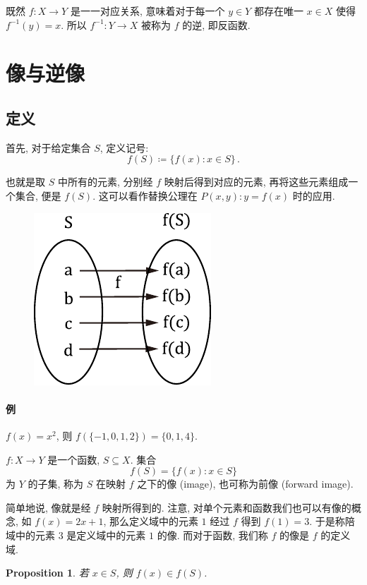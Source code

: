 \documentclass[UTF8]{ctexart}
\theoremstyle{mystyle}
\newtheorem{proposition}{Proposition}[section]
\theoremstyle{myremark}
\theoremstyle{plain}
\newcommand{\set}[1]{\{#1\}}
\begin{document}
既然 $ f \colon X \to Y $ 是一一对应关系, 意味着对于每一个 $ y \in Y $ 都存在唯一 $ x \in X $ 使得 $ f^{-1}(y) = x $. 所以 $ f^{-1} \colon Y \to X $ 被称为 $ f $ 的逆, 即反函数.

\section{像与逆像}
\subsection{定义}
首先, 对于给定集合 $ S $, 定义记号:
\[ f(S) \coloneqq \set{f(x) \colon x \in S}  \,.\]

也就是取 $ S $ 中所有的元素, 分别经 $ f $ 映射后得到对应的元素, 再将这些元素组成一个集合, 便是 $ f(S) $. 这可以看作替换公理在 $ P(x, y) \colon  y = f(x) $ 时的应用.

\begin{figure}[H]
    \centering
    \includegraphics[width = 0.3\linewidth]{./images/image.pdf}
\end{figure}


\paragraph{例}
$ f(x) = x^2 $, 则 $ f(\set{-1, 0, 1, 2}) = \set{0, 1, 4} $.


\begin{definition}
    $ f \colon X \to Y $ 是一个函数, $ S \subseteq X $. 集合 \[ f(S) = \set{f(x) \colon x \in S} \] 为 $ Y $ 的子集, 称为 $ S $ 在映射 $ f $ 之下的像 (image), 也可称为前像 (forward image).
\end{definition}

简单地说, 像就是经 $ f $ 映射所得到的. 注意, 对单个元素和函数我们也可以有像的概念, 如 $ f(x) = 2x + 1 $, 那么定义域中的元素 $ 1 $ 经过 $ f $ 得到 $ f(1) = 3 $. 于是称陪域中的元素 $ 3 $ 是定义域中的元素 $ 1 $ 的像. 而对于函数, 我们称 $ f $ 的像是 $ f $ 的定义域.

\begin{proposition}
    若 $ x \in S $, 则 $ f(x) \in f(S) $.
\end{proposition}
\end{document}
